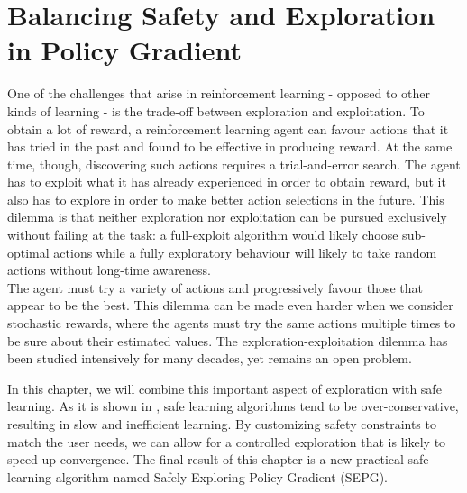 \chapter{Balancing Safety and Exploration in Policy Gradient}
\label{ch:balance}

\fancyhead[LE,RO]{\bfseries\thepage}                               
\fancyhead[LO]{\bfseries\rightmark}  


One of the challenges that arise in reinforcement learning - opposed to other kinds of learning - is the trade-off between exploration and exploitation. To obtain a lot of reward, a reinforcement learning agent can favour actions that it has tried in the past and found to be effective in producing reward. At the same time, though, discovering such actions requires a trial-and-error search. The agent has to exploit what it has already experienced in order to obtain reward, but it also has to explore in order to make better action selections in the future. This dilemma is that neither exploration nor exploitation can be pursued exclusively without failing at the task: a full-exploit algorithm would likely choose sub-optimal actions while a fully exploratory behaviour will likely to take random actions without long-time awareness.\\
The agent must try a variety of actions and progressively favour those that appear to be the best. This dilemma can be made even harder when we consider stochastic rewards, where the agents must try the same actions multiple times to be sure about their estimated values. The exploration-exploitation dilemma has been studied intensively for many decades, yet remains an open problem. 

In this chapter, we will combine this important aspect of exploration with safe learning. As it is shown in , safe learning algorithms tend to be over-conservative, resulting in slow and inefficient learning. By customizing safety constraints to match the user needs, we can allow for a controlled exploration that is likely to speed up convergence. The final result of this chapter is a new practical safe learning algorithm named Safely-Exploring Policy Gradient (SEPG). 


